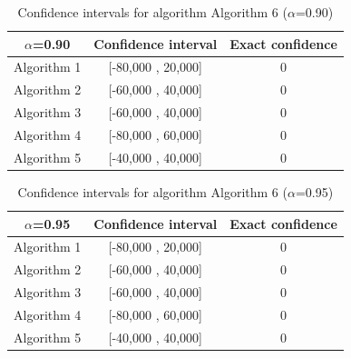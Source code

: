 \documentclass[a4paper,10pt]{article}
\begin{document}
\begin{table}[!htp]
\centering\small
\begin{tabular}{
|c|c|c|}
\hline
 $\alpha$=0.90 & Confidence interval & Exact confidence \\ \hline 
Algorithm 1 & [-80,000 , 20,000] & 0\\ \hline 
Algorithm 2 & [-60,000 , 40,000] & 0\\ \hline 
Algorithm 3 & [-60,000 , 40,000] & 0\\ \hline 
Algorithm 4 & [-80,000 , 60,000] & 0\\ \hline 
Algorithm 5 & [-40,000 , 40,000] & 0\\ \hline 

\end{tabular}
\caption{Confidence intervals for algorithm Algorithm 6 ($\alpha$=0.90)}
\end{table}
\begin{table}[!htp]
\centering\small
\begin{tabular}{
|c|c|c|}
\hline
 $\alpha$=0.95 & Confidence interval & Exact confidence \\ \hline 
Algorithm 1 & [-80,000 , 20,000] & 0\\ \hline 
Algorithm 2 & [-60,000 , 40,000] & 0\\ \hline 
Algorithm 3 & [-60,000 , 40,000] & 0\\ \hline 
Algorithm 4 & [-80,000 , 60,000] & 0\\ \hline 
Algorithm 5 & [-40,000 , 40,000] & 0\\ \hline 

\end{tabular}
\caption{Confidence intervals for algorithm Algorithm 6 ($\alpha$=0.95)}
\end{table}

 \clearpage 
\end{document}
